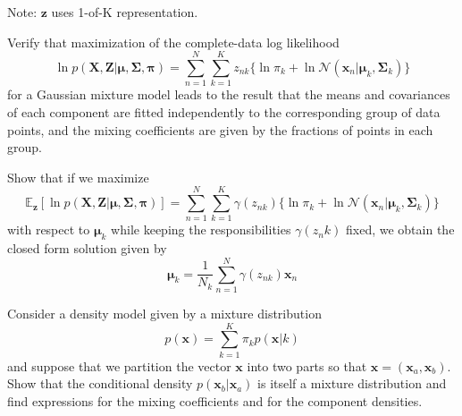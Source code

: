 \documentclass[a4 paper]{article}
\begin{document}
Note: $\mathbf{z}$ uses 1-of-K representation.

\newpage

 Verify that maximization of the complete-data log likelihood 
\begin{equation*}
    \ln p(\mathbf{X,Z}|\bm{\mu}, \bm{\Sigma}, \bm{\pi}) = \sum_{n=1}^N \sum_{k=1}^K z_{nk} \{\ln \pi _k + \ln \mathcal{N} (\mathbf{x}_n | \bm{\mu}_k, \bm{\Sigma}_k) \}
\end{equation*}
for a Gaussian mixture model leads to the result that the means and covariances of each component are fitted independently to the corresponding group of data points, and the mixing coefficients are given by the fractions of points in each group.


 Show that if we maximize
\begin{equation*}
    \mathbb{E}_\mathbf{z}[\ln p(\mathbf{X,Z}|\bm{\mu}, \bm{\Sigma}, \bm{\pi})] = \sum_{n=1}^N \sum_{k=1}^K \gamma (z_{nk})\{\ln \pi _k + \ln \mathcal{N} (\mathbf{x}_n | \bm{\mu}_k, \bm{\Sigma}_k) \}
\end{equation*}
with respect to $\bm{\mu}_k$ while keeping the responsibilities $\gamma (z_nk)$ fixed, we obtain the closed form solution given by
\begin{equation*}
    \bm{\mu}_k = \frac{1}{N_k} \sum_{n=1}^N \gamma(z_{nk})\mathbf{x}_n
\end{equation*}

\newpage

 Consider a density model given by a mixture distribution 
\begin{equation*}
    p(\mathbf{x})=\sum_{k=1}^{K} \pi _k p(\mathbf{x}|k)
\end{equation*}
and suppose that we partition the vector $\mathbf{x}$ into two parts so that $\mathbf{x}=(\mathbf{x}_a, \mathbf{x}_b)$. Show that the conditional density $p(\mathbf{x}_b|\mathbf{x}_a)$ is itself a mixture distribution and find expressions for the mixing coefficients and for the component densities.
\end{document}
